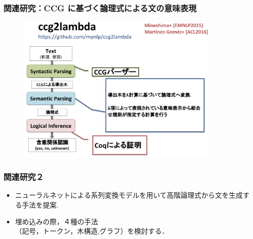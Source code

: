 \documentclass[dvipdfmx]{beamer}
\begin{document}
\begin{frame}
\frametitle{関連研究：CCG に基づく論理式による文の意味表現}
\begin{center}
\begin{figure}[h]
	\includegraphics[width=10cm]{c2l.png}
        \label{fig:c2l}
\end{figure}
\end{center}

\end{frame}




\begin{frame}
\frametitle{関連研究２}
\begin{center}
\end{center}
\begin{block}{}
  \begin{itemize}
    \item {\color{berry}ニューラルネットによる系列変換モデル}を用いて高階論理式から文を生成する手法を提案.\cite{seq2seq}
    \item 埋め込みの際，４種の手法\\（記号，トークン，木構造,グラフ）を検討する．
  \end{itemize}
\end{block}

\end{frame}
\end{document}
